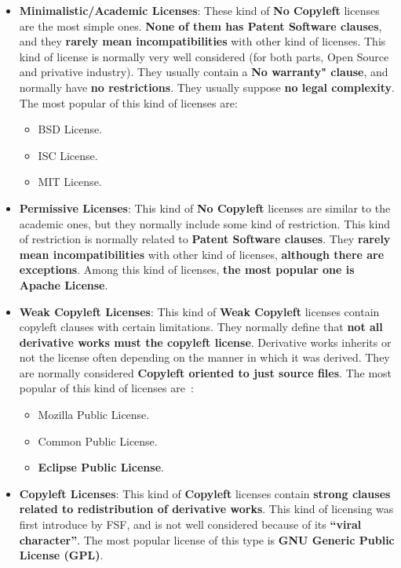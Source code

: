 \documentclass[a4paper, 12pt]{book}
\begin{document}
\begin{itemize}\itemsep0pt
 \item{\textbf{Minimalistic/Academic Licenses}}: These kind of \textbf{No Copyleft} licenses are the most simple ones. \textbf{None of them has Patent Software clauses}, and they \textbf{rarely mean incompatibilities} with other kind of licenses. This kind of license is normally very well considered (for both parts, Open Source and privative industry). They usually contain a \textbf{No warranty" clause}, and normally have \textbf{no restrictions}. They usually suppose \textbf{no legal complexity}. The most popular of this kind of licenses are:
   \begin{itemize}\itemsep0pt
    \item{BSD License}.
    \item{ISC License}.
    \item{MIT License}.
   \end{itemize}
 \item{\textbf{Permissive Licenses}}: This kind of \textbf{No Copyleft} licenses are similar to the academic ones, but they normally include some kind of restriction. This kind of restriction is normally related to \textbf{Patent Software clauses}. They \textbf{rarely mean incompatibilities} with other kind of licenses, \textbf{although there are exceptions}. Among this kind of licenses, \textbf{the most popular one is Apache License}.
 \item{\textbf{Weak Copyleft Licenses}}: This kind of \textbf{Weak Copyleft} licenses contain copyleft clauses with certain limitations. They normally define that \textbf{not all derivative works must the copyleft license}. Derivative works inherits or not the license often depending on the manner in which it was derived. They are normally considered \textbf{Copyleft oriented to just source files}. The most popular of this kind of licenses are~\cite{FSFLicense}:
   \begin{itemize}\itemsep0pt
    \item{Mozilla Public License}.
    \item{Common Public License}.
    \item{\textbf{Eclipse Public License}}.
   \end{itemize}
 \item{\textbf{Copyleft Licenses}}: This kind of \textbf{Copyleft} licenses contain \textbf{strong clauses related to redistribution of derivative works}. This kind of licensing was first introduce by FSF, and is not well considered because of its \textbf{``viral character''}. The most popular license of this type is \textbf{GNU Generic Public License (GPL)}.
\end{itemize}
\end{document}
